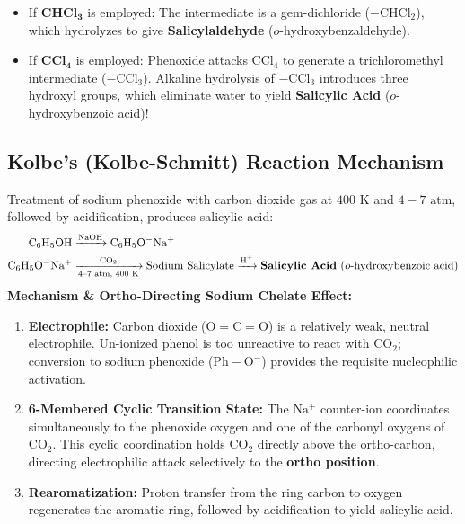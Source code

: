 \documentclass[10pt,a4paper]{article}
\begin{document}
\begin{trapbox}
\begin{itemize}
  \item If $\mathbf{CHCl_3}$ is employed: The intermediate is a gem-dichloride ($-\mathrm{CHCl_2}$), which hydrolyzes to give \textbf{Salicylaldehyde} ($o$-hydroxybenzaldehyde).
  \item If $\mathbf{CCl_4}$ is employed: Phenoxide attacks $\mathrm{CCl_4}$ to generate a trichloromethyl intermediate ($-\mathrm{CCl_3}$). Alkaline hydrolysis of $-\mathrm{CCl_3}$ introduces three hydroxyl groups, which eliminate water to yield \textbf{Salicylic Acid} ($o$-hydroxybenzoic acid)!
\end{itemize}
\end{trapbox}

\subsection{Kolbe's (Kolbe-Schmitt) Reaction Mechanism}

\begin{conceptbox}
Treatment of sodium phenoxide with carbon dioxide gas at $400\text{ K}$ and $4-7\text{ atm}$, followed by acidification, produces salicylic acid:
\begin{align*}
  \mathrm{C_6H_5OH} &\xrightarrow{\mathrm{NaOH}} \mathrm{C_6H_5O^-Na^+}\\
  \mathrm{C_6H_5O^-Na^+} &\xrightarrow[\text{4--7 atm, } 400\text{ K}]{\mathrm{CO_2}} \text{Sodium Salicylate} \xrightarrow{\mathrm{H^+}} \text{\textbf{Salicylic Acid}} \ (o\text{-hydroxybenzoic acid})
\end{align*}
\textbf{Mechanism \& Ortho-Directing Sodium Chelate Effect:}
\begin{enumerate}[leftmargin=*]
  \item \textbf{Electrophile:} Carbon dioxide ($\mathrm{O=C=O}$) is a relatively weak, neutral electrophile. Un-ionized phenol is too unreactive to react with $\mathrm{CO_2}$; conversion to sodium phenoxide ($\mathrm{Ph-O^-}$) provides the requisite nucleophilic activation.
  \item \textbf{6-Membered Cyclic Transition State:} The $\mathrm{Na^+}$ counter-ion coordinates simultaneously to the phenoxide oxygen and one of the carbonyl oxygens of $\mathrm{CO_2}$. This cyclic coordination holds $\mathrm{CO_2}$ directly above the ortho-carbon, directing electrophilic attack selectively to the \textbf{ortho position}.
  \item \textbf{Rearomatization:} Proton transfer from the ring carbon to oxygen regenerates the aromatic ring, followed by acidification to yield salicylic acid.
\end{enumerate}
\end{conceptbox}
\end{document}
